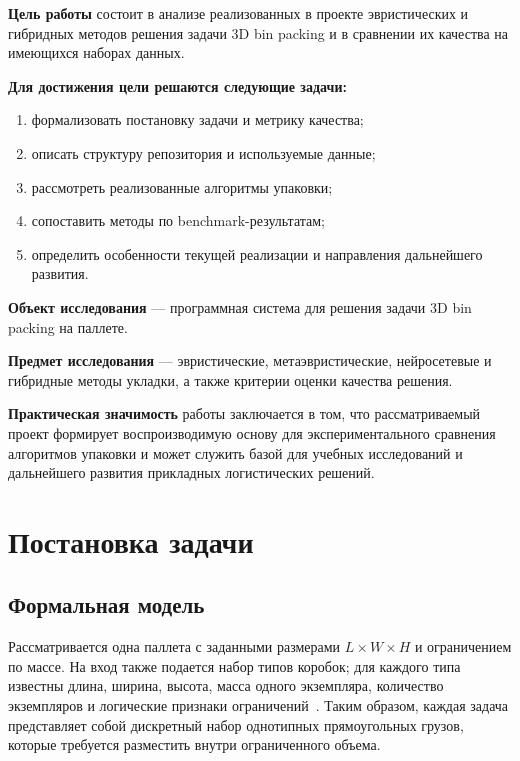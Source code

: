 \documentclass[14pt,a4paper]{extarticle}
\begin{document}
\textbf{Цель работы} состоит в анализе реализованных в проекте эвристических и гибридных методов решения задачи 3D bin packing и в сравнении их качества на имеющихся наборах данных.

\textbf{Для достижения цели решаются следующие задачи:}
\begin{enumerate}
  \item формализовать постановку задачи и метрику качества;
  \item описать структуру репозитория и используемые данные;
  \item рассмотреть реализованные алгоритмы упаковки;
  \item сопоставить методы по benchmark-результатам;
  \item определить особенности текущей реализации и направления дальнейшего развития.
\end{enumerate}

\textbf{Объект исследования} --- программная система для решения задачи 3D bin packing на паллете.

\textbf{Предмет исследования} --- эвристические, метаэвристические, нейросетевые и гибридные методы укладки, а также критерии оценки качества решения.

\textbf{Практическая значимость} работы заключается в том, что рассматриваемый проект формирует воспроизводимую основу для экспериментального сравнения алгоритмов упаковки и может служить базой для учебных исследований и дальнейшего развития прикладных логистических решений.

\pagebreak

\section{Постановка задачи}

\subsection{Формальная модель}

Рассматривается одна паллета с заданными размерами $L \times W \times H$ и ограничением по массе. На вход также подается набор типов коробок; для каждого типа известны длина, ширина, высота, масса одного экземпляра, количество экземпляров и логические признаки ограничений~\cite{project_repo}. Таким образом, каждая задача представляет собой дискретный набор однотипных прямоугольных грузов, которые требуется разместить внутри ограниченного объема.
\end{document}
